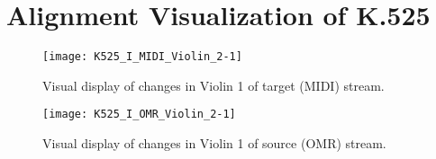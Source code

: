 \chapter{Alignment Visualization of K.525}\label{appa}
\clearpage

\begin{figure}[H]
\centering
\texttt{[image: K525\_I\_MIDI\_Violin\_2-1]}
\caption{Visual display of changes in Violin 1 of target (MIDI) stream.}
\end{figure}

\begin{figure}[H]
\centering
\texttt{[image: K525\_I\_OMR\_Violin\_2-1]}
\caption{Visual display of changes in Violin 1 of source (OMR) stream.}
\end{figure}



\clearpage
\newpage
